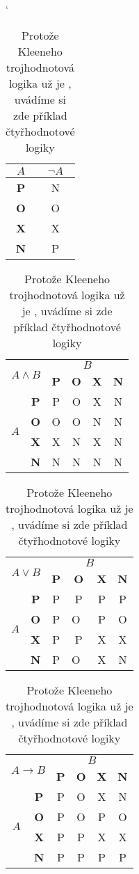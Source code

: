 \documentclass[a4paper, 11pt]{article}
\begin{document}
\begin{table}[h]
\begin{center}
\catcode` %
\begin{tabular}{|c|c|} \hline
$A$ & $\neg A$ \\ \hline
\textbf{P} & N \\ \hline
\textbf{O} & O \\ \hline
\textbf{X} & X \\ \hline
\textbf{N} & P \\ \hline
\end{tabular}
\begin{tabular}{|c|c|c|c|c|c|} \hline
\multicolumn{2}{|c|}{\multirow{2}{*}{$A\wedge B$}} & \multicolumn{4}{|c|}{$B$}\\ \cline{3-6}
\multicolumn{2}{|c|}{} & \textbf{P} & \textbf{O} & \textbf{X} & \textbf{N}\\ \hline
\multirow{4}{*}{$A$} & \textbf{P} & P & O & X & N\\ \cline{2-6}
					 & \textbf{O} & O & O & N & N\\ \cline{2-6}
					 & \textbf{X} & X & N & X & N\\ \cline{2-6}
				     & \textbf{N} & N & N & N & N\\ \hline
\end{tabular}
\begin{tabular}{|c|c|c|c|c|c|} \hline
\multicolumn{2}{|c|}{\multirow{2}{*}{$A\vee B$}} & \multicolumn{4}{|c|}{$B$}\\ \cline{3-6}
\multicolumn{2}{|c|}{} & \textbf{P} & \textbf{O} & \textbf{X} & \textbf{N}\\ \hline
\multirow{4}{*}{$A$} & \textbf{P} & P & P & P & P\\ \cline{2-6}
			  		 & \textbf{O} & P & O~& P & O\\ \cline{2-6}
					 & \textbf{X} & P & P & X & X\\ \cline{2-6}
					 & \textbf{N} & P & O~& X & N\\ \hline
\end{tabular}
\begin{tabular}{|c|c|c|c|c|c|} \hline
\multicolumn{2}{|c|}{\multirow{2}{*}{$A\rightarrow B$}} & \multicolumn{4}{|c|}{$B$}\\ \cline{3-6}
\multicolumn{2}{|c|}{} & \textbf{P} & \textbf{O} & \textbf{X} & \textbf{N}\\ \hline
\multirow{4}{*}{$A$} &\textbf{P} & P & O & X & N\\ \cline{2-6}
					 &\textbf{O} & P & O & P & O\\ \cline{2-6}
					 &\textbf{X} & P & P & X & X\\ \cline{2-6}
					 &\textbf{N} & P & P & P & P\\ \hline
\end{tabular}
\caption{Protože Kleeneho trojhodnotová logika už je , uvádíme si zde příklad čtyřhodnotové logiky}
\label{logic}
\end{center}
\end{table}
\pagebreak
\newpage
\end{document}
